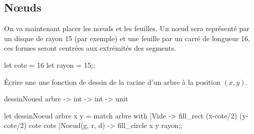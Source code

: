 \subsection{Nœuds}
\begin{minipage}{0.7\textwidth}
On va maintenant placer les nœuds et les feuilles. Un nœud sera représenté par un disque de rayon 15 (par exemple) et une feuille par un carré de longueur 16, ces formes seront centrées aux extrémités des segments.
\begin{ocaml}
let cote = 16
let rayon = 15;;
\end{ocaml}
\begin{question}{}{}
Écrire une une fonction de dessin de la racine d'un arbre à la position $(x, y)$.
\begin{ocaml}
dessinNoued arbre -> int -> int -> unit
\end{ocaml}
\reponse
\begin{ocaml}
let dessinNoeud arbre x y =
  match arbre with
  |Vide ->  fill_rect (x-cote/2) (y-cote/2) cote cote
  |Noeud(g, r, d) ->  fill_circle x y rayon;;
\end{ocaml}
\end{question}

\end{minipage}
\begin{minipage}{0.3\textwidth}
\begin{center}
\end{center}
\end{minipage}
